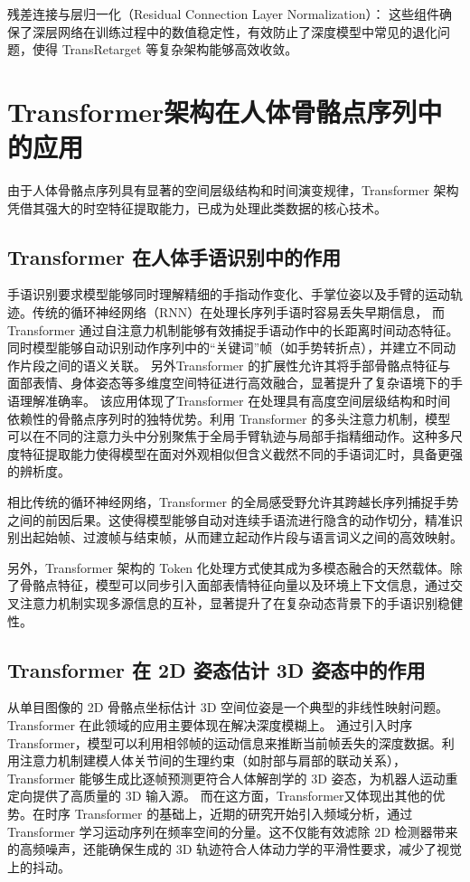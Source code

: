 残差连接与层归一化（Residual Connection  Layer Normalization）：
这些组件确保了深层网络在训练过程中的数值稳定性，有效防止了深度模型中常见的退化问题，使得 TransRetarget 等复杂架构能够高效收敛。

\section{Transformer架构在人体骨骼点序列中的应用}
由于人体骨骼点序列具有显著的空间层级结构和时间演变规律，Transformer 架构凭借其强大的时空特征提取能力，已成为处理此类数据的核心技术。

\subsection{Transformer 在人体手语识别中的作用}
手语识别要求模型能够同时理解精细的手指动作变化、手掌位姿以及手臂的运动轨迹。传统的循环神经网络（RNN）在处理长序列手语时容易丢失早期信息，
而 Transformer 通过自注意力机制能够有效捕捉手语动作中的长距离时间动态特征。同时模型能够自动识别动作序列中的“关键词”帧（如手势转折点），并建立不同动作片段之间的语义关联。
另外Transformer 的扩展性允许其将手部骨骼点特征与面部表情、身体姿态等多维度空间特征进行高效融合，显著提升了复杂语境下的手语理解准确率\cite{camgozSignLanguageTransformers2020}。
该应用体现了Transformer 在处理具有高度空间层级结构和时间依赖性的骨骼点序列时的独特优势。利用 Transformer 的多头注意力机制，模型可以在不同的注意力头中分别聚焦于全局手臂轨迹与局部手指精细动作。这种多尺度特征提取能力使得模型在面对外观相似但含义截然不同的手语词汇时，具备更强的辨析度。

相比传统的循环神经网络，Transformer 的全局感受野允许其跨越长序列捕捉手势之间的前因后果。这使得模型能够自动对连续手语流进行隐含的动作切分，精准识别出起始帧、过渡帧与结束帧，从而建立起动作片段与语言词义之间的高效映射。

另外，Transformer 架构的 Token 化处理方式使其成为多模态融合的天然载体。除了骨骼点特征，模型可以同步引入面部表情特征向量以及环境上下文信息，通过交叉注意力机制实现多源信息的互补，显著提升了在复杂动态背景下的手语识别稳健性。
\subsection{Transformer 在 2D 姿态估计 3D 姿态中的作用}
从单目图像的 2D 骨骼点坐标估计 3D 空间位姿是一个典型的非线性映射问题。Transformer 在此领域的应用主要体现在解决深度模糊上。
通过引入时序 Transformer，模型可以利用相邻帧的运动信息来推断当前帧丢失的深度数据。利用注意力机制建模人体关节间的生理约束（如肘部与肩部的联动关系），Transformer 能够生成比逐帧预测更符合人体解剖学的 3D 姿态，为机器人运动重定向提供了高质量的 3D 输入源\cite{zheng3dHumanPose2021}\cite{zhaoPoseformerv2ExploringFrequency2023}。
而在这方面，Transformer又体现出其他的优势。在时序 Transformer 的基础上，近期的研究开始引入频域分析，通过 Transformer 学习运动序列在频率空间的分量。这不仅能有效滤除 2D 检测器带来的高频噪声，还能确保生成的 3D 轨迹符合人体动力学的平滑性要求，减少了视觉上的抖动。

